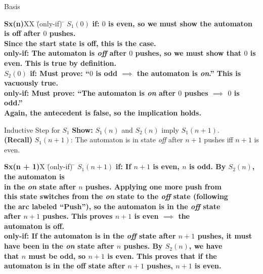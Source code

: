 \documentclass[style=sailor,size=12pt]{powerdot}
\begin{document}
\begin{wideslide}[bm=,toc=]{Basis}

\begin{tabbing}
{\bf Sx(n)}XX \=  (only-if) \= \kill
{\bf $S_1(0)$}  \>
           \bf{if:} \> 
           $0$ is even, so we must show the automaton is off after $0$ pushes.  \\
      \>\> Since the start state is off, this is the case.  \\[2ex]
      \>
     \bf{only-if:}\> 
          The automaton is {\em off\/} after $0$ pushes, so we must show that $0$ is\\ 
      \>\>   even. This is true by definition.   \\[4ex]
{\bf $S_2(0)$} \>
          \bf{if:} \> 
          Must prove: ``$0$ is odd $\implies$ the automaton is {\em
                   on\/}.'' This is\\
     \>\> vacuously true.  \\[2ex]
     \>
     \bf{only-if:} \> 
       Must prove: ``The automaton is {\em on\/} after $0$ pushes 
                   $\implies$ $0$ is odd.'' \\
     \>\> Again, the antecedent is false, so the implication holds.\\[2ex]
\end{tabbing}


\end{wideslide}

\begin{wideslide}[bm=,toc=]{Inductive Step for $S_1$}
{\bf Show:} $S_1(n)$ and $S_2(n)$ imply $S_1(n + 1)$.\\
{\bf (Recall)} $S_1(n+1)$: The automaton is in state \emph{off} after $n + 1$
pushes iff $n+1$ is even.  
\begin{tabbing}
{\bf Sx(n + 1)}X \=  (only-if) \= \kill
{\bf $S_1(n + 1)$}  \>
           \bf{if:} \> 
           If $n + 1$ is even, $n$ is odd. By $S_2(n)$, the automaton is \\
      \>\> in the \emph{on} state after $n$ pushes. Applying one more push from \\
      \>\> this state switches from the \emph{on} state to the \emph{off} state (following\\
      \>\> the arc labeled ``Push''), so the automaton is in the \emph{off} state \\
      \>\> after $n + 1$ pushes. This proves $n + 1$ is even $\implies$ the  \\
      \>\> automaton is off.
           \\[2ex]
      \>
     \bf{only-if:}\> 
           If the automaton is in the \emph{off} state after $n + 1$ pushes, it must \\
      \>\> have been in the \emph{on} state after $n$ pushes. By $S_2(n)$, we have\\
      \>\> that $n$ must be odd, so $n+1$ is even. This proves that if the \\
      \>\> automaton is in the off state after $n + 1$ pushes, $n+1$ is even.
           \\[2ex]
\end{tabbing}


\end{wideslide}
\end{document}
